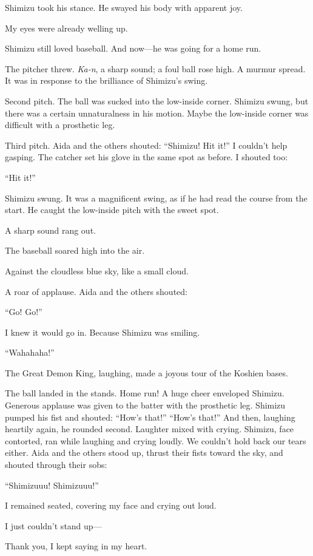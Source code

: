 \documentclass[
    a4paper,
    12pt,
    twoside,
    openany,
    UTF8,
    fontset=windows
]{ctexbook}
\begin{document}
Shimizu took his stance. He swayed his body with apparent joy.

My eyes were already welling up.

Shimizu still loved baseball. And now---he was going for a home run.

The pitcher threw. \textit{Ka-n}, a sharp sound; a foul ball rose high. A murmur spread. It was in response to the brilliance of Shimizu's swing.

Second pitch. The ball was sucked into the low-inside corner. Shimizu swung, but there was a certain unnaturalness in his motion. Maybe the low-inside corner was difficult with a prosthetic leg.

Third pitch. Aida and the others shouted: ``Shimizu! Hit it!'' I couldn't help gasping. The catcher set his glove in the same spot as before. I shouted too:

``Hit it!''

Shimizu swung. It was a magnificent swing, as if he had read the course from the start. He caught the low-inside pitch with the sweet spot.

A sharp sound rang out.

The baseball soared high into the air.

Against the cloudless blue sky, like a small cloud.

A roar of applause. Aida and the others shouted:

``Go! Go!''

I knew it would go in. Because Shimizu was smiling.

``Wahahaha!''

The Great Demon King, laughing, made a joyous tour of the Koshien bases.

The ball landed in the stands. Home run! A huge cheer enveloped Shimizu. Generous applause was given to the batter with the prosthetic leg. Shimizu pumped his fist and shouted: ``How's that!'' ``How's that!'' And then, laughing heartily again, he rounded second. Laughter mixed with crying. Shimizu, face contorted, ran while laughing and crying loudly. We couldn't hold back our tears either. Aida and the others stood up, thrust their fists toward the sky, and shouted through their sobs:

``Shimizuuu! Shimizuuu!''

I remained seated, covering my face and crying out loud.

I just couldn't stand up---

Thank you, I kept saying in my heart.
\end{document}
